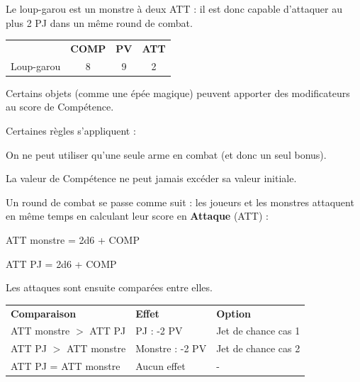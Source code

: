 \begin{frame}[b]
{

Le loup-garou est un monstre à deux ATT : il est donc capable d'attaquer au plus 2 PJ dans un même round de combat.

\begin{center}
\begin{tabular}{lccc}
 & \textbf{COMP} & \textbf{PV} & \textbf{ATT} \\
Loup-garou & 8 & 9 & 2 \\
\end{tabular}
\end{center}



Certains objets (comme une épée magique) peuvent apporter des modificateurs au score de Compétence.

Certaines règles s'appliquent :

\begin{myitemize}
\item On ne peut utiliser qu'une seule arme en combat (et donc un seul bonus).
\item La valeur de Compétence ne peut jamais excéder sa valeur initiale.
\end{myitemize}


Un round de combat se passe comme suit : les joueurs et les monstres attaquent en même temps en calculant leur score en \textbf{Attaque} (ATT) :
\begin{myitemize}
\item ATT monstre = 2d6 + COMP
\item ATT PJ = 2d6 + COMP
\end{myitemize}

Les attaques sont ensuite comparées entre elles.

\begin{center}
\begin{tabular}{lll}
\textbf{Comparaison} & \textbf{Effet} & \textbf{Option} \\
ATT monstre $>$ ATT PJ & PJ : -2 PV      & Jet de chance cas 1 \\
ATT PJ $>$ ATT monstre & Monstre : -2 PV & Jet de chance cas 2 \\
ATT PJ = ATT monstre & Aucun effet & - \\
\end{tabular}
\end{center}

}
\end{frame}
